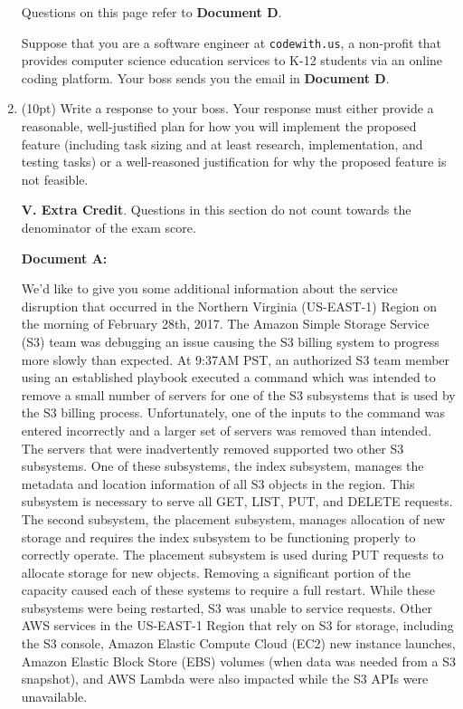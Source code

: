 \documentclass{report}
\newif\ifkey
\newcommand{\answerlong}[1]{\ifkey\color{red}\textbf{#1}\color{black}\else\vspace{0.5in}\fi\xspace}
\newcommand*{\pts}[1]{\addtocounter{points}{#1}(#1pt)}
\begin{document}
\begin{spacing}{1.4}
\begin{enumerate}[leftmargin=*]
    \newpage

    Questions on this page refer to \textbf{Document D}.

    Suppose that you are a software engineer at \lstinline{codewith.us}, a non-profit that provides computer science education
    services to K-12 students via an online coding platform. Your boss sends you the email in \textbf{Document D}.

  \item \pts{10} Write a response to your boss. Your response must either provide a reasonable, well-justified plan
    for how you will implement the proposed feature (including task sizing and at least research, implementation, and testing tasks)
    or a well-reasoned justification for why the proposed feature is not feasible.

    \answerlong{The proposed feature is an instance of the halting problem, and Mr. Rice's insistence that
      you get the correct answer 100\% of the time means that it is impossible to implement the feature as described.
    Correct answers must be phrased as an email, and use a polite but firm tone.}

    \newpage
    
    \textbf{V. Extra Credit}. Questions in this section do not count towards the denominator of the exam score.

    \newpage

    \textbf{Document A:}
    
      We’d like to give you some additional information about the service disruption that occurred in the Northern Virginia (US-EAST-1) Region on the morning of February 28th, 2017. The Amazon Simple Storage Service (S3) team was debugging an issue causing the S3 billing system to progress more slowly than expected. At 9:37AM PST, an authorized S3 team member using an established playbook executed a command which was intended to remove a small number of servers for one of the S3 subsystems that is used by the S3 billing process. Unfortunately, one of the inputs to the command was entered incorrectly and a larger set of servers was removed than intended. The servers that were inadvertently removed supported two other S3 subsystems.  One of these subsystems, the index subsystem, manages the metadata and location information of all S3 objects in the region. This subsystem is necessary to serve all GET, LIST, PUT, and DELETE requests. The second subsystem, the placement subsystem, manages allocation of new storage and requires the index subsystem to be functioning properly to correctly operate. The placement subsystem is used during PUT requests to allocate storage for new objects. Removing a significant portion of the capacity caused each of these systems to require a full restart. While these subsystems were being restarted, S3 was unable to service requests. Other AWS services in the US-EAST-1 Region that rely on S3 for storage, including the S3 console, Amazon Elastic Compute Cloud (EC2) new instance launches, Amazon Elastic Block Store (EBS) volumes (when data was needed from a S3 snapshot), and AWS Lambda were also impacted while the S3 APIs were unavailable.


\end{enumerate}
\end{spacing}
\end{document}
